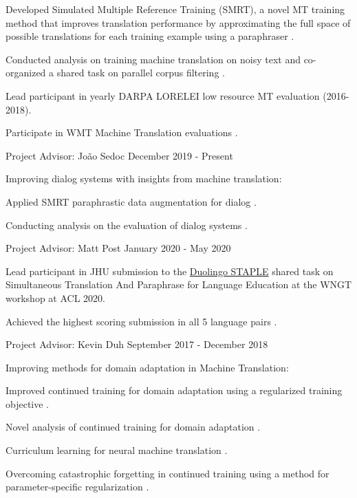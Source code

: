 \documentclass[margin,line,hyperref,color]{res}
\newcounter{shared-enum}
\newenvironment{packed_itemize}{
\begin{itemize}[leftmargin=1.5em]
  \setlength{\itemsep}{0pt}
  \setlength{\parskip}{0pt}
  \setlength{\parsep}{0pt}
}{\end{itemize}}
\begin{document}
\begin{resume}
\begin{packed_itemize}
\item Developed Simulated Multiple Reference Training (SMRT), a novel MT training method that improves translation performance by approximating the full space of possible translations for each training example using a paraphraser \citep{khayrallah-etal-2020-simulated}.
\item Conducted analysis on training machine translation on noisy text \citep{Khayrallah+Koehn2018WNMT} and co-organized a shared task on parallel corpus filtering \citep{Koehn+2018WMT}.
\item Lead participant in yearly DARPA LORELEI low resource MT evaluation (2016-2018). %
\item Participate in WMT Machine Translation evaluations \citep{Ding+2016WMT,Ding+2017WMT,Khayrallah+2018WMT}.
\end{packed_itemize}

Project Advisor:  Jo\~ao Sedoc \hfill  December 2019 - Present
\begin{packed_itemize}
\item Improving dialog systems with insights from machine translation:
\item Applied SMRT paraphrastic data augmentation for dialog \citep{khayrallah-sedoc-2020-smrt}.
\item Conducting analysis on the evaluation of dialog systems \citep{khayrallah-sedoc-2020-measuring}.
\end{packed_itemize}


Project Advisor:  Matt Post  \hfill  January 2020 - May 2020
\begin{packed_itemize}
\item Lead participant in JHU submission to the \href{https://sharedtask.duolingo.com/}{Duolingo STAPLE} shared task on Simultaneous Translation And Paraphrase for Language Education at the WNGT workshop at ACL 2020.
\item Achieved the highest scoring submission in all 5 language pairs \citep{khayrallah-etal-2020-jhu}.
\end{packed_itemize}


Project Advisor:  Kevin Duh  \hfill  September 2017 - December 2018
\begin{packed_itemize}
\item Improving methods for domain adaptation in Machine Translation: 
\item Improved continued training for domain adaptation using a regularized training objective \citep{Khayrallah+2018WNMT}.
\item Novel analysis of continued training for domain adaptation \citep{Thompson+2018WMT}.
\item Curriculum learning for neural machine translation \citep{Zhang+2018arxiv}.
\item Overcoming catastrophic forgetting in continued training using a method for parameter-specific regularization \citep{Thompson+2019NAACL}.
\end{packed_itemize}


\end{resume}
\end{document}

